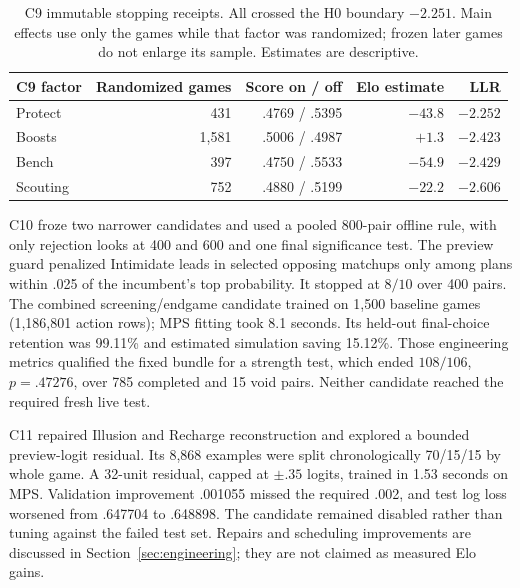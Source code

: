 \begin{table}[htbp]
\centering\small
\begin{tabular}{lrrrr}
\toprule
C9 factor & Randomized games & Score on / off & Elo estimate & LLR \\
\midrule
Protect & 431 & .4769 / .5395 & $-43.8$ & $-2.252$ \\
Boosts & 1,581 & .5006 / .4987 & $+1.3$ & $-2.423$ \\
Bench & 397 & .4750 / .5533 & $-54.9$ & $-2.429$ \\
Scouting & 752 & .4880 / .5199 & $-22.2$ & $-2.606$ \\
\bottomrule
\end{tabular}
\caption{C9 immutable stopping receipts. All crossed the H0 boundary
$-2.251$. Main effects use only the games while that factor was randomized;
frozen later games do not enlarge its sample. Estimates are descriptive.}
\label{tab:c9-final}
\end{table}

C10 froze two narrower candidates and used a pooled 800-pair offline rule,
with only rejection looks at 400 and 600 and one final significance test.
The preview guard penalized Intimidate leads in selected opposing matchups
only among plans within .025 of the incumbent's top probability. It stopped
at $8/10$ over 400 pairs. The combined screening/endgame candidate trained
on 1,500 baseline games (1,186,801 action rows); MPS fitting took 8.1 seconds.
Its held-out final-choice retention was 99.11\% and estimated simulation
saving 15.12\%. Those engineering metrics qualified the fixed bundle for a
strength test, which ended $108/106$, $p=.47276$, over 785 completed and
15 void pairs. Neither candidate reached the required fresh live test.

C11 repaired Illusion and Recharge reconstruction and explored a bounded
preview-logit residual. Its 8,868 examples were split chronologically
70/15/15 by whole game. A 32-unit residual, capped at $\pm.35$ logits,
trained in 1.53 seconds on MPS. Validation improvement .001055 missed the
required .002, and test log loss worsened from .647704 to .648898. The
candidate remained disabled rather than tuning against the failed test set.
Repairs and scheduling improvements are discussed in
Section~\ref{sec:engineering}; they are not claimed as measured Elo gains.


